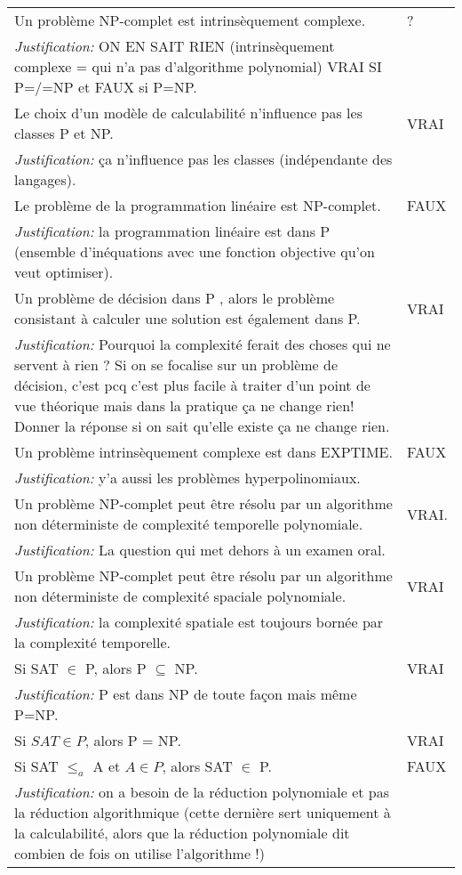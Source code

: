 \begin{tabular}{p{13cm}|l}
     Un problème NP-complet est intrinsèquement complexe. & ? \\
    \textit{Justification:} ON EN SAIT RIEN (intrinsèquement complexe = qui n'a pas d'algorithme polynomial) VRAI SI P=/=NP et FAUX si P=NP. & \\
    \hline
    Le choix d’un modèle de calculabilité n’influence pas les classes P et NP. & VRAI \\
    \textit{Justification:} ça n'influence pas les classes (indépendante des langages). & \\
    \hline
    Le problème de la programmation linéaire est NP-complet. & FAUX \\
    \textit{Justification:} la programmation linéaire est dans P (ensemble d'inéquations avec une fonction objective qu'on veut optimiser). & \\
    \hline
    Un problème de décision dans P , alors le problème consistant à calculer une solution est également dans P. & VRAI \\
    \textit{Justification:} Pourquoi la complexité ferait des choses qui ne servent à rien ? Si on se focalise sur un problème de décision, c'est pcq c'est plus facile à traiter d'un point de vue théorique mais dans la pratique ça ne change rien! Donner la réponse si on sait qu'elle existe ça ne change rien. & \\
    \hline
    Un problème intrinsèquement complexe est dans EXPTIME.  & FAUX \\
    \textit{Justification:} y'a aussi les problèmes hyperpolinomiaux.& \\
    \hline
    Un problème NP-complet peut être résolu par un algorithme non déterministe de complexité temporelle polynomiale. & VRAI. \\
    \textit{Justification:} La question qui met dehors à un examen oral. & \\
    \hline
    Un problème NP-complet peut être résolu par un algorithme non déterministe de complexité spaciale polynomiale. & VRAI \\
    \textit{Justification:}  la complexité spatiale est toujours bornée par la complexité temporelle. & \\
    \hline
    Si SAT $\in$ P, alors P $\subseteq$ NP.& VRAI \\
    \textit{Justification:} P est dans NP de toute façon mais même P=NP. & \\
    \hline
    Si $SAT \in P$, alors P = NP. & VRAI \\
    \hline
    Si SAT $\leq_{a}$ A et $A \in P$, alors SAT $\in$ P.& FAUX \\
    \textit{Justification:} on a besoin de la réduction polynomiale et pas la réduction algorithmique (cette dernière sert uniquement à la calculabilité, alors que la réduction polynomiale dit combien de fois on utilise l'algorithme !) & \\
    \hline

\end{tabular}
